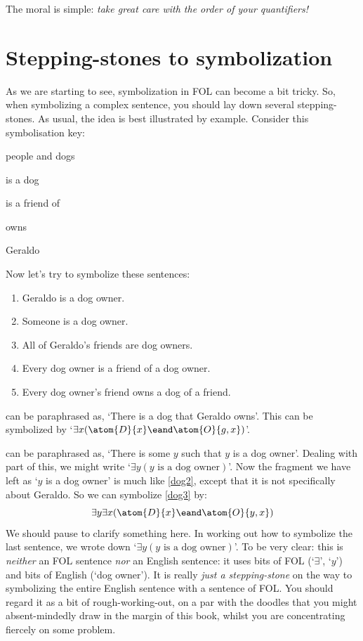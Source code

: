 The moral is simple: \emph{take great care with the order of your quantifiers!}


\section{Stepping-stones to symbolization}
As we are starting to see, symbolization in FOL can become a bit tricky. So, when symbolizing a complex sentence, you should lay down several stepping-stones. As usual, the idea is best illustrated by example. Consider this symbolisation key: 
\begin{ekey}
\item[\text{domain}] people and dogs
\item[\atom{D}{x}]  is a dog
\item[\atom{F}{x,y}]  is a friend of 
\item[\atom{O}{x,y}]  owns 
\item[g] Geraldo
\end{ekey}
Now let's try to symbolize these sentences:
\begin{enumerate}
\item\label{dog2} Geraldo is a dog owner.
\item\label{dog3} Someone is a dog owner.
\item\label{dog4} All of Geraldo's friends are dog owners.
\item\label{dog5} Every dog owner is a friend of a dog owner.
\item\label{dog6} Every dog owner's friend owns a dog of a friend.
\end{enumerate}
 can be paraphrased as, `There is a dog that Geraldo owns'. This can be symbolized by `$\exists x(\atom{D}{x} \eand \atom{O}{g,x})$'.

 can be paraphrased as, `There is some $y$ such that $y$ is a dog owner'. Dealing with part of this, we might write `$\exists y(y\text{ is a dog owner})$'. Now the fragment we have left as `$y$ is a dog owner' is much like \cref*{dog2}, except that it is not specifically about Geraldo. So we can symbolize \cref*{dog3} by:
$$\exists y \exists x(\atom{D}{x} \eand \atom{O}{y,x})$$
We should pause to clarify something here. In working out how to
symbolize the last sentence, we wrote down `$\exists y(y\text{ is a
dog owner})$'. To be very clear: this is \emph{neither} an FOL
sentence \emph{nor} an English sentence: it uses bits of FOL
(`$\exists$', `$y$') and bits of English (`dog owner'). It is really
\emph{just a stepping-stone} on the way to symbolizing the entire
English sentence with a sentence of FOL. You should regard it as a bit of
rough-working-out, on a par with the doodles that you might
absent-mindedly draw in the margin of this book, whilst you are
concentrating fiercely on some problem.  


